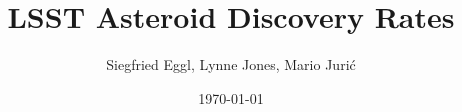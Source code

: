 \documentclass[DM,authoryear,toc,hidelinks]{lsstdoc}
\title{LSST Asteroid Discovery Rates}
\author{%
Siegfried Eggl,
Lynne Jones,
Mario Juri\'c
}
\date{\today}
\begin{document}

\maketitle 




\appendix
\label{sec:bib}


%
\label{sec:acronyms}
\printglossaries
\end{document}
